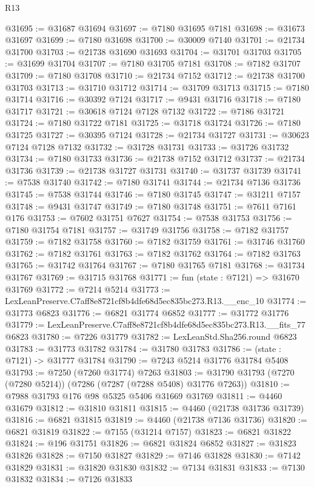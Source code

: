 \begin{lexlean}{R13}
\begin{coremodule}
@31695 := @31687 @31694
@31697 := @7180 @31695 @7181
@31698 := @31673 @31697
@31699 := @7180 @31698
@31700 := @30009 @7140
@31701 := @21734 @31700
@31703 := @21738 @31690 @31693
@31704 := @31701 @31703
@31705 := @31699 @31704
@31707 := @7180 @31705 @7181
@31708 := @7182 @31707
@31709 := @7180 @31708
@31710 := @21734 @7152
@31712 := @21738 @31700 @31703
@31713 := @31710 @31712
@31714 := @31709 @31713
@31715 := @7180 @31714
@31716 := @30392 @7124
@31717 := @9431 @31716
@31718 := @7180 @31717
@31721 := @30618 @7124 @7128 @7132
@31722 := @7186 @31721
@31724 := @7180 @31722 @7181
@31725 := @31718 @31724
@31726 := @7180 @31725
@31727 := @30395 @7124
@31728 := @21734 @31727
@31731 := @30623 @7124 @7128 @7132
@31732 := @31728 @31731
@31733 := @31726 @31732
@31734 := @7180 @31733
@31736 := @21738 @7152 @31712
@31737 := @21734 @31736
@31739 := @21738 @31727 @31731
@31740 := @31737 @31739
@31741 := @7538 @31740
@31742 := @7180 @31741
@31744 := @21734 @7136 @31736
@31745 := @7538 @31744
@31746 := @7180 @31745
@31747 := @31211 @7157
@31748 := @9431 @31747
@31749 := @7180 @31748
@31751 := @7611 @7161 @176
@31753 := @7602 @31751 @7627
@31754 := @7538 @31753
@31756 := @7180 @31754 @7181
@31757 := @31749 @31756
@31758 := @7182 @31757
@31759 := @7182 @31758
@31760 := @7182 @31759
@31761 := @31746 @31760
@31762 := @7182 @31761
@31763 := @7182 @31762
@31764 := @7182 @31763
@31765 := @31742 @31764
@31767 := @7180 @31765 @7181
@31768 := @31734 @31767
@31769 := @31715 @31768
@31771 := fun (state : @7121) => @31670 @31769
@31772 := @7214 @5214
@31773 := LexLeanPreserve.C7aff8e8721cf8b4dfe68d5ec835bc273.R13.__enc_10
@31774 := @31773 @6823
@31776 := @6821 @31774 @6852
@31777 := @31772 @31776
@31779 := LexLeanPreserve.C7aff8e8721cf8b4dfe68d5ec835bc273.R13.__fits_77 @6823
@31780 := @7226 @31779
@31782 := LexLeanStd.Sha256.round @6823
@31783 := @31773 @31782
@31784 := @31780 @31783
@31786 := (state : @7121) -> @31777 @31784
@31790 := @7243 @5214 @31776 @31784 @5408
@31793 := @7250 (@7260 @31774) @7263
@31803 := @31790 @31793 (@7270 (@7280 @5214)) (@7286 (@7287 (@7288 @5408) @31776 @7263))
@31810 := @7988 @31793 @176 @98 @5325 @5406 @31669 @31769
@31811 := @4460 @31679
@31812 := @31810 @31811
@31815 := @4460 (@21738 @31736 @31739)
@31816 := @6821 @31815
@31819 := @4460 (@21738 @7136 @31736)
@31820 := @6821 @31819
@31822 := @7155 (@31214 @7157)
@31823 := @6821 @31822
@31824 := @196 @31751
@31826 := @6821 @31824 @6852
@31827 := @31823 @31826
@31828 := @7150 @31827
@31829 := @7146 @31828
@31830 := @7142 @31829
@31831 := @31820 @31830
@31832 := @7134 @31831
@31833 := @7130 @31832
@31834 := @7126 @31833

\end{coremodule}
\end{lexlean}
